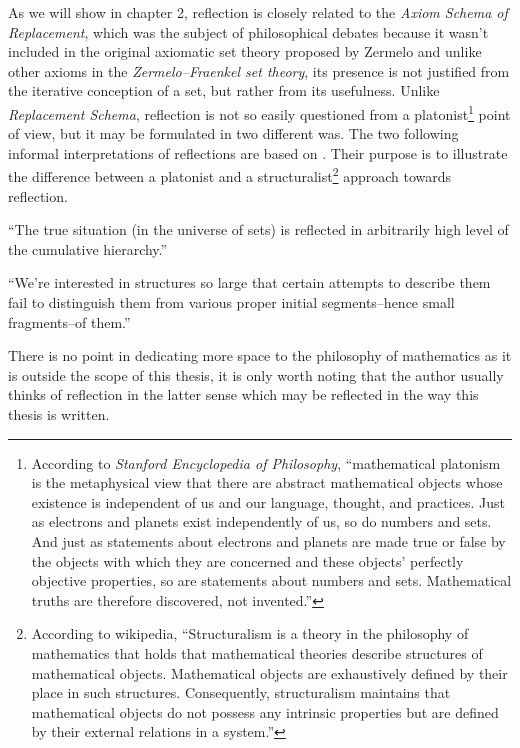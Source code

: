 As we will show in chapter 2, reflection is closely related to the \emph{Axiom Schema of Replacement}, which was the subject of philosophical debates because it wasn't included in the original axiomatic set theory proposed by Zermelo and unlike other axioms in the \emph{Zermelo–Fraenkel set theory}, its presence is not justified from the iterative conception of a set, but rather from its usefulness. Unlike \emph{Replacement Schema}, reflection is not so easily questioned from a platonist\footnote{According to \emph{Stanford Encyclopedia of Philosophy}, ``mathematical platonism is the metaphysical view that there are abstract mathematical objects whose existence is independent of us and our language, thought, and practices. Just as electrons and planets exist independently of us, so do numbers and sets. And just as statements about electrons and planets are made true or false by the objects with which they are concerned and these objects' perfectly objective properties, so are statements about numbers and sets. Mathematical truths are therefore discovered, not invented.''} point of view, but it may be formulated in two different was. The two following informal interpretations of reflections are based on \cite{HellmanInfinite}. Their purpose is to illustrate the difference between a platonist and a structuralist\footnote{According to wikipedia, ``Structuralism is a theory in the philosophy of mathematics that holds that mathematical theories describe structures of mathematical objects. Mathematical objects are exhaustively defined by their place in such structures. Consequently, structuralism maintains that mathematical objects do not possess any intrinsic properties but are defined by their external relations in a system.''} approach towards reflection.
\begin{displayquote}
``The true situation (in the universe of sets) is reflected in arbitrarily high level of the cumulative hierarchy.''
\end{displayquote}
\begin{displayquote}
``We're interested in structures so large that certain attempts to describe them fail to distinguish them from various proper initial segments–hence small fragments–of them.''
\end{displayquote}
There is no point in dedicating more space to the philosophy of mathematics as it is outside the scope of this thesis, it is only worth noting that the author usually thinks of reflection in the latter sense which may be reflected in the way this thesis is written.


